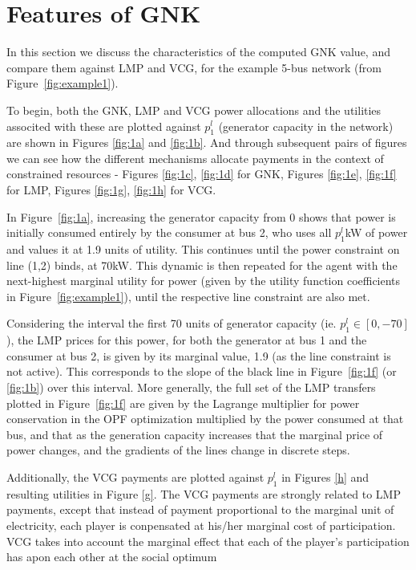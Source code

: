\section{Features of GNK}\label{sec:features}

In this section we discuss the characteristics of the computed GNK value, and compare them against LMP and VCG, for the example 5-bus network (from Figure~\ref{fig:example1}).

To begin, both the GNK, LMP and VCG power allocations and the utilities associted with these are plotted against $p_1^l$ (generator capacity in the network) are shown in Figures \ref{fig:1a} and \ref{fig:1b}.
And through subsequent pairs of figures we can see how the different mechanisms allocate payments in the context of constrained resources - Figures \ref{fig:1c}, \ref{fig:1d} for GNK, Figures \ref{fig:1e}, \ref{fig:1f} for LMP, Figures \ref{fig:1g}, \ref{fig:1h} for VCG.

\iffigures
% 

\fi

In Figure~\ref{fig:1a}, increasing the generator capacity from $0$ shows that power is initially consumed entirely by the consumer at bus 2, 
who uses all $p_1^l$kW of power and values it at 1.9 units of utility. This continues until the power constraint on line (1,2) binds, at 70kW.  
This dynamic is then repeated for the agent with the next-highest marginal utility for power (given by the utility function coefficients in Figure~\ref{fig:example1}), until the respective line constraint are also met.

Considering the interval the first 70 units of generator capacity (ie. $p_1^l \in [0,-70]$), the LMP prices for this power, for both the generator at bus 1 and the consumer at bus 2, is given by its marginal value, 1.9 (as the line constraint is not active). This corresponds to the slope of the black line in Figure~\ref{fig:1f} (or \ref{fig:1b}) over this interval. 
More generally, the full set of the LMP transfers plotted in Figure~\ref{fig:1f} are given by the Lagrange multiplier for power conservation in the OPF optimization multiplied by the power consumed at that bus, and that as the generation capacity increases that the marginal price of power changes, and the gradients of the lines change in discrete steps.

Additionally, the VCG payments are plotted against $p_1^l$ in Figures \ref{h} and resulting utilities in Figure \ref{g}.
The VCG payments are strongly related to LMP payments, except that instead of payment proportional to the marginal unit of electricity, each player is conpensated at his/her marginal cost of participation.
VCG takes into account the marginal effect that each of the player's participation has apon each other at the social optimum

